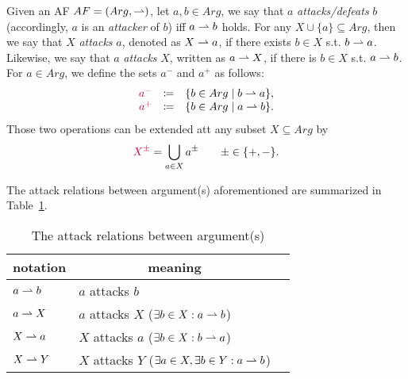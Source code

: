 Given an AF $AF=(Arg,\rightharpoonup)$, 
let $a,b \in Arg$, 
we say that $a$ \textit{attacks/defeats} $b$ (accordingly, $a$ is an \textit{attacker} of $b$) iff $a \rightharpoonup b$ holds.
% 
For any $X \cup \{a\} \subseteq Arg$, 
then we say that $X$ \textit{attacks} $a$, 
denoted as {\color{purple} $X \rightharpoonup a$}, 
if there exists $b \in X$ s.t. $b \rightharpoonup a$.
% 
Likewise, 
we say that $a$ \textit{attacks} $X$, 
written as {\color{purple} $a \rightharpoonup X$}, 
if there is $b \in X$ s.t. $a \rightharpoonup b$.
% 
For $a \in Arg$, 
we define the sets $a^-$ and $a^+$ as follows: 
\[
\begin{array}{rll}
    {\color{purple} a^-} &\coloneqq& \{b \in Arg \mid b \rightharpoonup a\},  \\
    
    {\color{purple} a^+} &\coloneqq& \{b \in Arg \mid a \rightharpoonup b\}.  \\
\end{array}
\]
Those two operations can be extended att any subset $X \subseteq Arg$ by
\[
    {\color{purple} X^\pm}   = \bigcup_{a \in X} a^\pm 
    \qquad
    \pm \in\{+,-\}.
\]



The attack relations between argument(s) aforementioned are summarized in Table~\ref{tab: attack-relation}. 

\begin{table}[ht!]
    \centering
    \caption{The attack relations between argument(s)}
    \label{tab: attack-relation} 
    \renewcommand{\arraystretch}{1.2}
    \begin{tabular}{l||ll}
    \hline
    \multicolumn{1}{c||}{notation} & 
    \multicolumn{1}{c}{meaning} \\
    \hline

    $a \rightharpoonup b$ & 
    $a$ attacks $b$  \\

    $a \rightharpoonup X$ &  
    $a$ attacks $X$ ($\exists b \in X: a \rightharpoonup b$) \\ 

    $X \rightharpoonup a$  &  
    $X$ attacks $a$  ($\exists b \in X: b \rightharpoonup a$) \\

    
    $X \rightharpoonup Y$ &
    $X$ attacks $Y$ 
    ($\exists a \in X, \exists b \in Y: a \rightharpoonup b$)  \\

    \hline
\end{tabular}
\end{table}






